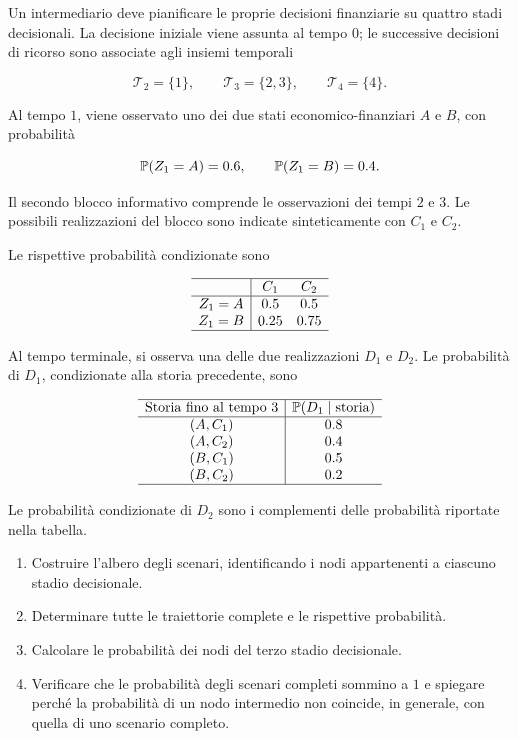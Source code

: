 \begin{exercise}

\label{ex:cap15-albero-probabilita}

Un intermediario deve pianificare le proprie
decisioni finanziarie su quattro stadi decisionali.
La decisione iniziale viene assunta al tempo $0$;
le successive decisioni di ricorso sono associate
agli insiemi temporali

\[
\mathcal T_2=\{1\},
\qquad
\mathcal T_3=\{2,3\},
\qquad
\mathcal T_4=\{4\}.
\]

Al tempo $1$, viene osservato uno dei due stati
economico-finanziari $A$ e $B$, con probabilit\`a

\[
\mathbb{P}(Z_1=A)=0.6,
\qquad
\mathbb{P}(Z_1=B)=0.4.
\]

Il secondo blocco informativo comprende
le osservazioni dei tempi $2$ e $3$.
Le possibili realizzazioni del blocco
sono indicate sinteticamente con $C_1$ e $C_2$.

Le rispettive probabilit\`a condizionate sono

\[
\begin{array}{c|cc}
\hline
 & C_1 & C_2\\
\hline
Z_1=A & 0.5 & 0.5\\
Z_1=B & 0.25 & 0.75\\
\hline
\end{array}
\]

Al tempo terminale, si osserva
una delle due realizzazioni $D_1$ e $D_2$.
Le probabilit\`a di $D_1$,
condizionate alla storia precedente, sono

\[
\begin{array}{c|c}
\hline
\text{Storia fino al tempo }3
&
\mathbb{P}(D_1\mid\text{storia})\\
\hline
(A,C_1)&0.8\\
(A,C_2)&0.4\\
(B,C_1)&0.5\\
(B,C_2)&0.2\\
\hline
\end{array}
\]

Le probabilit\`a condizionate di $D_2$
sono i complementi delle probabilit\`a
riportate nella tabella.

\begin{enumerate}

\item Costruire l'albero degli scenari,
identificando i nodi appartenenti
a ciascuno stadio decisionale.

\item Determinare tutte le traiettorie complete
e le rispettive probabilit\`a.

\item Calcolare le probabilit\`a dei nodi
del terzo stadio decisionale.

\item Verificare che le probabilit\`a
degli scenari completi sommino a $1$
e spiegare perch\'{e} la probabilit\`a
di un nodo intermedio non coincide,
in generale, con quella di uno scenario completo.

\end{enumerate}

\end{exercise}

